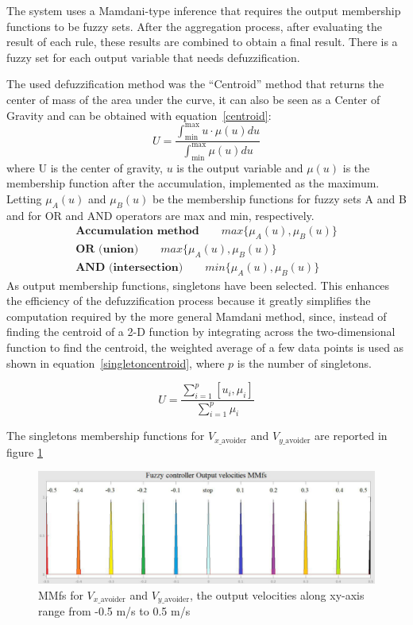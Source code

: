The system uses a Mamdani-type inference that requires the output membership functions to be fuzzy sets. After the aggregation process, \ie after evaluating the result of each rule, these results are combined to obtain a final result. There is a fuzzy set for each output variable that needs defuzzification.

The used defuzzification method was the ``Centroid'' method that returns the center of mass of the area under the curve, it can also be seen as a Center of Gravity and can be obtained with equation~\ref{centroid}:
\begin{equation}
U=\dfrac{\int_{\text{min}}^{\text{max}} u\cdot\mu(u) du}{\int_{\text{min}}^{\text{max}}\mu(u) du}
\label{centroid}
\end{equation}
where U is the center of gravity, $u$ is the output variable and $\mu(u)$ is the membership function after the accumulation, implemented as the maximum. Letting $\mu_A(u)$ and $\mu_B(u)$ be the membership functions for fuzzy sets A and B and for OR and AND operators are max and min, respectively.
\begin{align}
	\textbf{Accumulation method}\qquad max\lbrace\mu_A(u),\mu_B(u)\rbrace\\
	\textbf{OR (union)}\qquad max\lbrace\mu_A(u),\mu_B(u)\rbrace\\
	\textbf{AND (intersection)}\qquad min\lbrace\mu_A(u),\mu_B(u)\rbrace
\end{align}
As output membership functions, singletons have been selected. This enhances the efficiency of the defuzzification process because it greatly simplifies the computation required by the more general Mamdani method, since, instead of finding the centroid of a 2-D function by integrating across the two-dimensional function to find the centroid, the weighted average of a few data points is used as shown in equation~\ref{singletoncentroid}, where $p$ is the number of singletons.

\begin{equation}
U =	\dfrac{\sum_{i=1}^{p}\left[u_i,\mu_i\right]}{\sum_{i=1}^{p}\mu_i}
\label{singletoncentroid}
\end{equation} 

The singletons membership functions for $V_{x\_ \text{avoider}}$ and $V_{y\_ \text{avoider}}$ are reported in figure \ref{outmmf}

\begin{figure}[h]
	\centering
	\includegraphics[width=\textwidth]{images/03-foundation/outputmmf}
	\caption{MMfs for $V_{x\_ \text{avoider}}$ and $V_{y\_ \text{avoider}}$, the output velocities along xy-axis range from -0.5 m/s to 0.5 m/s}
	\label{outmmf} 
\end{figure}

